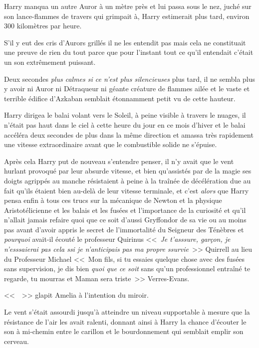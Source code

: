 Harry manqua un autre Auror à un mètre près et lui passa sous le nez, juché sur son lance-flammes de travers qui grimpait à, Harry estimerait plus tard, environ 300 kilomètres par heure.

S'il y eut des cris d'Aurors grillés il ne les entendit pas mais cela ne constituait une preuve de rien du tout parce que pour l'instant tout ce qu'il entendait c'était un son extrêmement puissant.

Deux secondes \emph{plus calmes si ce n'est plus silencieuses} plus tard, il ne sembla plus y avoir ni Auror ni Détraqueur ni géante créature de flammes ailée et le vaste et terrible édifice d'Azkaban semblait étonnamment petit vu de cette hauteur.

Harry dirigea le balai volant vers le Soleil, à peine visible à travers le nuages, il n'était pas haut dans le ciel à cette heure du jour en ce mois d'hiver et le balai accéléra deux secondes de plus dans la même direction et amassa très rapidement une vitesse extraordinaire avant que le combustible solide ne s'épuise.

Après cela Harry put de nouveau s'entendre penser, il n'y avait que le vent hurlant provoqué par leur absurde vitesse, et bien qu'assistés par de la magie ses doigts agrippés au manche résistaient à peine à la traînée de décélération due au fait qu'ils étaient bien au-delà de leur vitesse terminale, et c'est \emph{alors} que Harry pensa enfin à tous ces trucs sur la mécanique de Newton et la physique Aristotélicienne et les balais et les fusées et l'importance de la curiosité et qu'il n'allait jamais refaire quoi que ce soit d'aussi Gryffondor de sa vie ou au moins pas avant d'avoir appris le secret de l'immortalité du Seigneur des Ténèbres et \emph{pourquoi} avait-il écouté le professeur Quirinus <<~\emph{Je t'asssure, garçon, je n'esssaierai pas cela ssi je n'anticipais pas ma propre ssurvie}~>> Quirrell au lieu du Professeur Michael <<~Mon fils, si tu essaies quelque chose avec des fusées sans supervision, je dis bien \emph{quoi que ce soit} sans qu'un professionnel entraîné te regarde, tu mourras et Maman sera triste~>> Verres-Evans.

\later

<<~~>> glapit Amelia à l'intention du miroir.

\later

Le vent s'était assourdi jusqu'à atteindre un niveau supportable à mesure que la résistance de l'air les avait ralenti, donnant ainsi à Harry la chance d'écouter le son à mi-chemin entre le carillon et le bourdonnement qui semblait emplir son cerveau.

